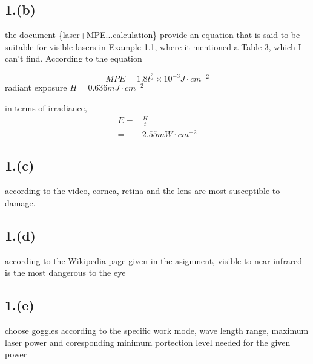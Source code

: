 \documentclass{article}
\begin{document}
\subsection{1.(b)}
{the document \{laser+MPE...calculation\} provide an equation that is said to be suitable for visible lasers in Example 
1.1, where it mentioned a Table 3, which I can't find. According to the equation}\par
$$
MPE = 1.8t^{\frac{3}{4}}\times 10^{-3}J\cdot cm^{-2}
$$
{radiant exposure $H = 0.636 mJ\cdot cm^{-2}$}\par
{in terms of irradiance, 
\begin{equation}
    \begin{split}
        E =& \frac{H}{t}\\
        =&2.55mW\cdot cm^{-2}
    \end{split}
\end{equation}}\par

\subsection{1.(c)}
{according to the video, cornea, retina and the lens are most susceptible to damage.}\par

\subsection{1.(d)}
{according to the Wikipedia page given in the asignment, visible to near-infrared is the most dangerous to the eye}\par

\subsection{1.(e)}
{choose goggles according to the specific work mode, wave length range, maximum laser power and coresponding minimum 
portection level needed for the given power}\par
\end{document}
